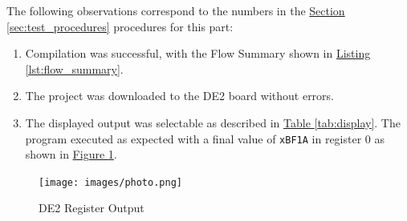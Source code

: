 The following observations correspond to the numbers in the \hyperref[sec:test_procedures]{Section \ref*{sec:test_procedures}} procedures for this part:

\begin{enumerate}
    \item Compilation was successful, with the Flow Summary shown in \hyperref[lst:flow_summary]{Listing \ref*{lst:flow_summary}}.
    \item The project was downloaded to the DE2 board without errors.
    \item The displayed output was selectable as described in \hyperref[tab:display]{Table \ref*{tab:display}}.
    The program executed as expected with a final value of \verb|xBF1A| in register 0 as shown in \hyperref[fig:de2]{Figure \ref*{fig:de2}}.
\end{enumerate}



\FloatBarrier
\begin{figure}
    \texttt{[image: images/photo.png]}
    \caption{DE2 Register Output\label{fig:de2}}
\end{figure}


